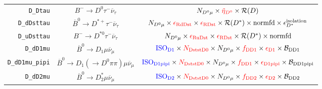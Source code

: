 \begin{landscape}
\begin{table}
\begin{tabular}{r|c|c}
         \texttt{D\_Dtau} &                   $B^- \rightarrow D^0 \tau^- \overline{\nu}_\tau$                   &                                                                                                                                            $N_{D^0 \mu} \times \textcolor{red}{\tilde{\eta}_{D^0}} \times \mathcal{R}(D)$                                                                                                                                             \\
      \texttt{D\_dDsttau} &            $\overline{B}^0 \rightarrow D^{*+} \tau^- \overline{\nu}_\tau$            &                                                                                     $N_{D^0 \mu} \times \textcolor{red}{\epsilon_\text{RdDst}} \times \textcolor{red}{\epsilon_\text{RDst}} \times \mathcal{R}(D^*) \times \text{normfd} \times \epsilon_{D^*}^\text{isolation}$                                                                                      \\
      \texttt{D\_uDsttau} &                 $B^- \rightarrow D^{*0} \tau^- \overline{\nu}_\tau$                  &                                                                                                         $N_{D^0 \mu} \times \textcolor{red}{\epsilon_\text{RuDst}} \times \textcolor{red}{\epsilon_\text{RDst}} \times \mathcal{R}(D^*) \times \text{normfd}$                                                                                                         \\
        \texttt{D\_dD1mu} &               $\overline{B}^0 \rightarrow D_1 \mu \overline{\nu}_\mu$                &                                                                          $\textcolor{blue}{\text{ISO}_\text{D1}} \times \textcolor{red}{N_\text{DststD0}} \times N_{D^0 \mu} \times \textcolor{red}{f_\text{DD1}} \times \textcolor{red}{\epsilon_\text{D1}} \times \mathcal{B}_\text{DD1}$                                                                           \\
  \texttt{D\_dD1mu\_pipi} &   $\overline{B}^0 \rightarrow D_1 (\rightarrow D^0 \pi\pi) \mu \overline{\nu}_\mu$   &                                                                    $\textcolor{blue}{\text{ISO}_\text{D1pipi}} \times \textcolor{red}{N_\text{DststD0}} \times N_{D^0 \mu} \times \textcolor{red}{f_\text{DD1}} \times \textcolor{red}{\epsilon_\text{D1pipi}} \times \mathcal{B}_\text{DD1pipi}$                                                                     \\
        \texttt{D\_dD2mu} &              $\overline{B}^0 \rightarrow D^*_2 \mu \overline{\nu}_\mu$               &                                                                          $\textcolor{blue}{\text{ISO}_\text{D2}} \times \textcolor{red}{N_\text{DststD0}} \times N_{D^0 \mu} \times \textcolor{red}{f_\text{DD2}} \times \textcolor{red}{\epsilon_\text{D2}} \times \mathcal{B}_\text{DD2}$                                                                           \\

\end{tabular}
\end{table}
\end{landscape}
